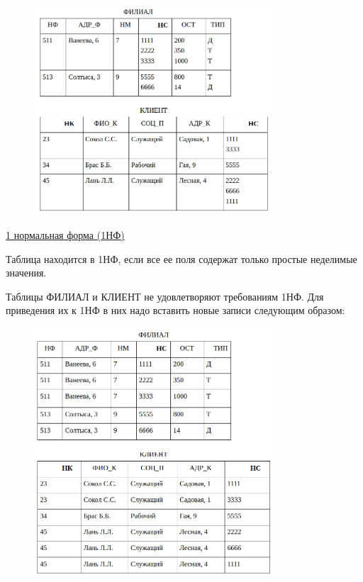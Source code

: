 \begin{enumerate}
    \begin{figure}[H]
        \centering
        \includegraphics[width=0.8\textwidth]{assets/security/pic18.png}
        \label{fig:mesh20}
    \end{figure}

    \underline{1 нормальная форма (1НФ)}

    Таблица находится в 1НФ, если все ее поля содержат только простые неделимые значения.

    Таблицы ФИЛИАЛ и КЛИЕНТ не удовлетворяют требованиям 1НФ. Для приведения их к 1НФ в них надо вставить новые
    записи следующим образом:

    \begin{figure}[H]
        \centering
        \includegraphics[width=0.8\textwidth]{assets/security/pic19.png}
        \label{fig:mesh21}
    \end{figure}


\end{enumerate}
